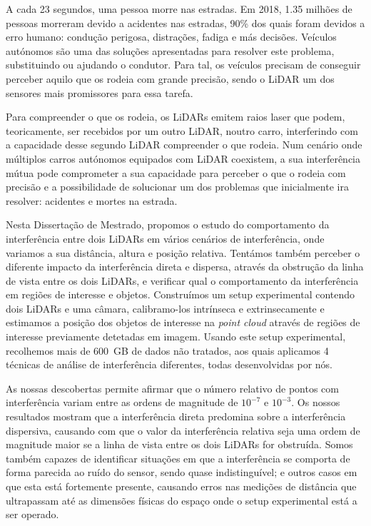 A cada 23 segundos, uma pessoa morre nas estradas. Em 2018, 1.35 milhões de pessoas morreram devido a acidentes nas estradas, 90\% dos quais foram devidos a erro humano: condução perigosa, distrações, fadiga e más decisões. Veículos autónomos são uma das soluções apresentadas para resolver este problema, substituindo ou ajudando o condutor. Para tal, os veículos precisam de conseguir perceber aquilo que os rodeia com grande precisão, sendo o LiDAR um dos sensores mais promissores para essa tarefa.

Para compreender o que os rodeia, os LiDARs emitem raios laser que podem, teoricamente, ser recebidos por um outro LiDAR, noutro carro, interferindo com a capacidade desse segundo LiDAR compreender o que rodeia. Num cenário onde múltiplos carros autónomos equipados com LiDAR coexistem, a sua interferência mútua pode comprometer a sua capacidade para perceber o que o rodeia com precisão e a possibilidade de solucionar um dos problemas que inicialmente ira resolver: acidentes e mortes na estrada.

Nesta Dissertação de Mestrado, propomos o estudo do comportamento da interferência entre dois LiDARs em vários cenários de interferência, onde variamos a sua distância, altura e posição relativa. Tentámos também perceber o diferente impacto da interferência direta e dispersa, através da obstrução da linha de vista entre os dois LiDARs, e verificar qual o comportamento da interferência em regiões de interesse e objetos. Construímos um setup experimental contendo dois LiDARs e uma câmara, calibramo-los intrínseca e extrinsecamente e estimamos a posição dos objetos de interesse na \textit{point cloud} através de regiões de interesse previamente detetadas em imagem. Usando este setup experimental, recolhemos mais de $600$~GB de dados não tratados, aos quais aplicamos 4 técnicas de análise de interferência diferentes, todas desenvolvidas por nós.

As nossas descobertas permite afirmar que o número relativo de pontos com interferência variam entre as ordens de magnitude de $10^{-7}$ e $10^{-3}$. Os nossos resultados mostram que a interferência direta predomina sobre a interferência dispersiva, causando com que o valor da interferência relativa seja uma ordem de magnitude maior se a linha de vista entre os dois LiDARs for obstruída. Somos também capazes de identificar situações em que a interferência se comporta de forma parecida ao ruído do sensor, sendo quase indistinguível; e outros casos em que esta está fortemente presente, causando erros nas medições de distância que ultrapassam até as dimensões físicas do espaço onde o setup experimental está a ser operado.

